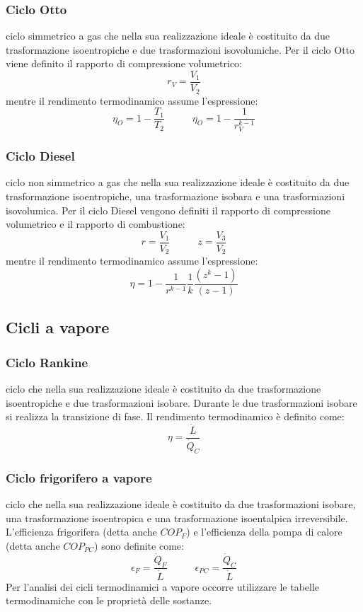 \subsubsection{Ciclo Otto}
ciclo simmetrico a gas che nella sua realizzazione ideale è costituito da due
trasformazione isoentropiche e due trasformazioni isovolumiche. \newline
Per il ciclo Otto viene definito il rapporto di compressione volumetrico:
\[
    r_V = \frac{V_1}{V_2}
\]
mentre il rendimento termodinamico assume l'espressione:
\[
    \eta_{O} = 1- \frac{T_1}{T_2} \;\;\;\;\;\;\;\;\;\; \eta_{O} = 1- \frac{1}{r_V^{k-1}}
\]
\subsubsection{Ciclo Diesel}
ciclo non simmetrico a gas che nella sua realizzazione ideale è costituito da due
trasformazione isoentropiche, una trasformazione isobara e una trasformazioni isovolumica. \newline
Per il ciclo Diesel vengono definiti il rapporto di compressione volumetrico e il rapporto di
combustione: 
\[
    r= \frac{V_1}{V_2} \;\;\;\;\;\;\;\;\;\;z = \frac{V_3}{V_2}
\]
mentre il rendimento termodinamico assume l'espressione:
\[
    \eta = 1- \frac{1}{r^{k-1}} \frac{1}{k} \frac{(z^k - 1)}{(z-1)}
\]
\subsection{Cicli a vapore}
\subsubsection{Ciclo Rankine}
ciclo che nella sua realizzazione ideale è costituito da due trasformazione
isoentropiche e due trasformazioni isobare. Durante le due trasformazioni isobare si realizza
la transizione di fase. \newline
Il rendimento termodinamico è definito come:
\[
    \eta = \frac{\dot{L}}{\dot{Q}_C}
\]
\subsubsection{Ciclo frigorifero a vapore}
ciclo che nella sua realizzazione ideale è costituito da due
trasformazioni isobare, una trasformazione isoentropica e una trasformazione isoentalpica
irreversibile. \newline
L'efficienza frigorifera (detta anche $COP_F$) e l'efficienza della pompa di calore (detta anche $COP_{PC}$) sono definite come:
\[
    \epsilon_F = \frac{\dot{Q}_F}{\dot{L}} \;\;\;\;\;\;\;\;\;\;\epsilon_{PC} = \frac{\dot{Q}_C}{\dot{L}}
\]
Per l'analisi dei cicli termodinamici a vapore occorre utilizzare le tabelle termodinamiche con le proprietà delle sostanze.
